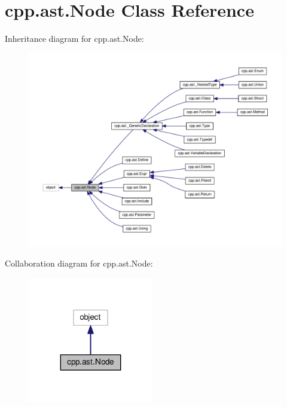 \hypertarget{classcpp_1_1ast_1_1Node}{}\section{cpp.\+ast.\+Node Class Reference}
\label{classcpp_1_1ast_1_1Node}


Inheritance diagram for cpp.\+ast.\+Node\+:
\nopagebreak
\begin{figure}[H]
\begin{center}
\leavevmode
\includegraphics[width=350pt]{classcpp_1_1ast_1_1Node__inherit__graph}
\end{center}
\end{figure}


Collaboration diagram for cpp.\+ast.\+Node\+:
\nopagebreak
\begin{figure}[H]
\begin{center}
\leavevmode
\includegraphics[width=155pt]{classcpp_1_1ast_1_1Node__coll__graph}
\end{center}
\end{figure}
